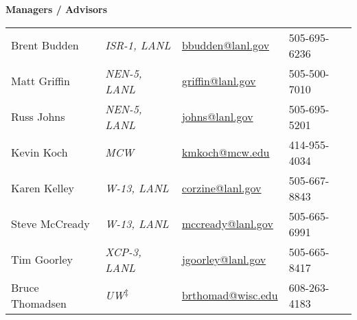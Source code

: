 
\begin{minipage}{0.50\textwidth} \footnotesize
\begin{center}
{\normalsize \textbf{Managers / Advisors}}
\end{center}
\begin{tabular}{llll|}
Brent Budden &  \textit{ISR-1, LANL} &  \href{mailto:bbudden@lanl.gov}{bbudden@lanl.gov} & 505-695-6236 \\
Matt Griffin &  \textit{NEN-5, LANL}  &  \href{mailto:griffin@lanl.gov}{griffin@lanl.gov} & 505-500-7010 \\
Russ Johns &  \textit{NEN-5, LANL} &  \href{mailto:johns@lanl.gov}{johns@lanl.gov} & 505-695-5201 \\
Kevin Koch & \textit{MCW} & \href{mailto:kmkoch@mcw.edu}{kmkoch@mcw.edu} & 414-955-4034 \\
Karen Kelley &  \textit{W-13, LANL} & \href{mailto:corzine@lanl.gov}{corzine@lanl.gov} & 505-667-8843 \\
Steve McCready & \textit{W-13, LANL} & \href{mailto:mccready@lanl.gov}{mccready@lanl.gov} & 505-665-6991 \\
Tim Goorley & \textit{XCP-3, LANL} &\href{mailto:jgoorley@lanl.gov}{jgoorley@lanl.gov} & 505-665-8417 \\
Bruce Thomadsen & \textit{UW}\textsuperscript{$\ddagger$} & \href{mailto:brthomad@wisc.edu}{brthomad@wisc.edu} &  608-263-4183 \\
\end{tabular}
\end{minipage}%
